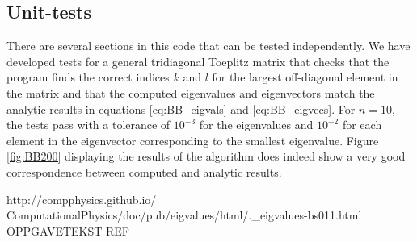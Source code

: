 \documentclass[reprint,english,notitlepage,nofootinbib]{revtex4-1}  %
\begin{document}
\subsection{Unit-tests}

There are several sections in this code that can be tested independently. We have developed tests for a general tridiagonal Toeplitz matrix that checks that the program finds the correct indices $k$ and $l$ for the largest off-diagonal element in the matrix and that the computed eigenvalues and eigenvectors match the analytic results in equations \ref{eq:BB_eigvals} and \ref{eq:BB_eigvecs}. For $n = 10$, the tests pass with a tolerance of $10^{-3}$ for the eigenvalues and $10^{-2}$ for each element in the eigenvector corresponding to the smallest eigenvalue. Figure \ref{fig:BB200} displaying the results of the algorithm does indeed show a very good correspondence between computed and analytic results.


\onecolumngrid
\begin{thebibliography}{}
 http://compphysics.github.io/
ComputationalPhysics/doc/pub/eigvalues/html/.\_eigvalues-bs011.html
 OPPGAVETEKST REF

\end{thebibliography}
\end{document}
